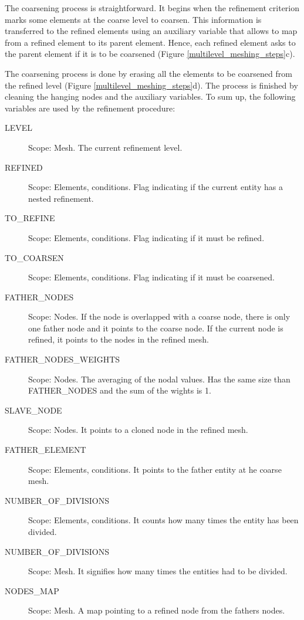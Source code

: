 The coarsening process is straightforward. It begins when the refinement criterion marks some elements at the coarse level to coarsen. This information is transferred to the refined elements using an auxiliary variable that allows to map from a refined element to its parent element. Hence, each refined element asks to the parent element if it is to be coarsened (Figure \ref{multilevel_meshing_steps}{\color{wrmBlue}c}).

The coarsening process is done by erasing all the elements to be coarsened from the refined level (Figure \ref{multilevel_meshing_steps}{\color{wrmBlue}d}). The process is finished by cleaning the hanging nodes and the auxiliary variables.
To sum up, the following variables are used by the refinement procedure:
\begin{description}
    \item[LEVEL] Scope: Mesh. The current refinement level.
    \item[REFINED] Scope: Elements, conditions. Flag indicating if the current entity has a nested refinement.
    \item[TO\_REFINE] Scope: Elements, conditions. Flag indicating if it must be refined.
    \item[TO\_COARSEN] Scope: Elements, conditions. Flag indicating if it must be coarsened.
    \item[FATHER\_NODES] Scope: Nodes. If the node is overlapped with a coarse node, there is only one father node and it points to the coarse node. If the current node is refined, it points to the nodes in the refined mesh.
    \item[FATHER\_NODES\_WEIGHTS] Scope: Nodes. The averaging of the nodal values. Has the same size than FATHER\_NODES and the sum of the wights is 1.
    \item[SLAVE\_NODE] Scope: Nodes. It points to a cloned node in the refined mesh.
    \item[FATHER\_ELEMENT] Scope: Elements, conditions. It points to the father entity at he coarse mesh.
    \item[NUMBER\_OF\_DIVISIONS] Scope: Elements, conditions. It counts how many times the entity has been divided.
    \item[NUMBER\_OF\_DIVISIONS] Scope: Mesh. It signifies how many times the entities had to be divided.
    \item[NODES\_MAP] Scope: Mesh. A map pointing to a refined node from the fathers nodes.
\end{description}


